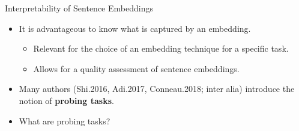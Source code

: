 \documentclass[accentcolor=tud1a,colorbacktitle,inverttitle,landscape,german,presentation,t]{tudbeamer}
\begin{document}
\begin{frame}{Interpretability of Sentence Embeddings}{}
	\vspace*{-4mm}
	\begin{itemize}\setlength\itemsep{1em}
		\item It is advantageous to know what is captured by an embedding.
		\begin{itemize}
			\item Relevant for the choice of an embedding technique for a specific task.
			\item Allows for a quality assessment of sentence embeddings.
		\end{itemize}
		\item Many authors (Shi.2016, Adi.2017, Conneau.2018; inter alia) introduce the notion of \textbf{probing tasks}.
		\item What are probing tasks?
	\end{itemize}

	\vspace*{3mm}
\end{frame}
\end{document}
